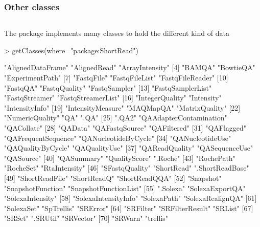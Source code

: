\documentclass{beamer}
\begin{document}
\begin{frame}[fragile]
\frametitle{Other classes}
\begin{column}{1\textwidth}
  \bit
      \item The package implements many classes to hold the different kind of data
            \begin{uncoverenv}
\begin{Schunk}
\begin{Sinput}
> getClasses(where="package:ShortRead")
\end{Sinput}
\begin{Soutput}
 [1] "AlignedDataFrame"       "AlignedRead"            "ArrayIntensity"        
 [4] "BAMQA"                  "BowtieQA"               "ExperimentPath"        
 [7] "FastqFile"              "FastqFileList"          "FastqFileReader"       
[10] "FastqQA"                "FastqQuality"           "FastqSampler"          
[13] "FastqSamplerList"       "FastqStreamer"          "FastqStreamerList"     
[16] "IntegerQuality"         "Intensity"              "IntensityInfo"         
[19] "IntensityMeasure"       "MAQMapQA"               "MatrixQuality"         
[22] "NumericQuality"         "QA"                     ".QA"                   
[25] ".QA2"                   "QAAdapterContamination" "QACollate"             
[28] "QAData"                 "QAFastqSource"          "QAFiltered"            
[31] "QAFlagged"              "QAFrequentSequence"     "QANucleotideByCycle"   
[34] "QANucleotideUse"        "QAQualityByCycle"       "QAQualityUse"          
[37] "QAReadQuality"          "QASequenceUse"          "QASource"              
[40] "QASummary"              "QualityScore"           ".Roche"                
[43] "RochePath"              "RocheSet"               "RtaIntensity"          
[46] "SFastqQuality"          "ShortRead"              ".ShortReadBase"        
[49] "ShortReadFile"          "ShortReadQ"             "ShortReadQQA"          
[52] "Snapshot"               "SnapshotFunction"       "SnapshotFunctionList"  
[55] ".Solexa"                "SolexaExportQA"         "SolexaIntensity"       
[58] "SolexaIntensityInfo"    "SolexaPath"             "SolexaRealignQA"       
[61] "SolexaSet"              "SpTrellis"              "SRError"               
[64] "SRFilter"               "SRFilterResult"         "SRList"                
[67] "SRSet"                  ".SRUtil"                "SRVector"              
[70] "SRWarn"                 "trellis"               
\end{Soutput}
\end{Schunk}
       \end{uncoverenv} 
  \eit
  \end{column}
\end{frame}
\end{document}

